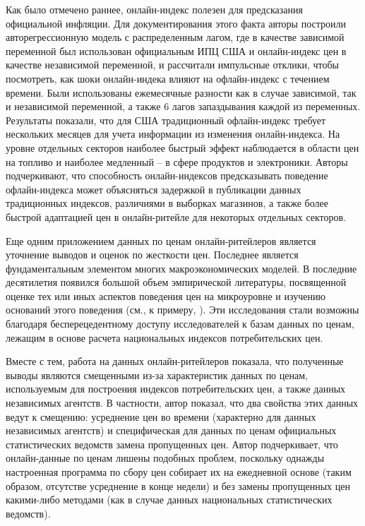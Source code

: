 Как было отмечено раннее, онлайн-индекс полезен для предсказания официальной инфляции. Для документирования этого факта авторы построили авторегрессионную модель с распределенным лагом, где в качестве зависимой переменной был использован официальным ИПЦ США и онлайн-индекс цен в качестве независимой переменной, и рассчитали импульсные отклики, чтобы посмотреть, как шоки онлайн-индека влияют на офлайн-индекс с течением времени. Были использованы ежемесячные разности как в случае зависимой, так и независимой переменной, а также 6 лагов запаздывания каждой из переменных. Результаты показали, что для США традиционный офлайн-индекс требует нескольких месяцев для учета информации из изменения онлайн-индекса. На уровне отдельных секторов наиболее быстрый эффект наблюдается в области цен на топливо и наиболее медленный – в сфере продуктов и электроники. Авторы подчеркивают, что способность онлайн-индексов предсказывать поведение офлайн-индекса может объясняться задержкой в публикации данных традиционных индексов, различиями в выборках магазинов, а также более быстрой адаптацией цен в онлайн-ритейле для некоторых отдельных секторов. 

Еще одним приложением данных по ценам онлайн-ритейлеров является уточнение выводов и оценок по жесткости цен. Последнее является фундаментальным элементом многих макроэкономических моделей. В последние десятилетия появился большой объем эмпирической литературы, посвященной оценке тех или иных аспектов поведения цен на микроуровне и изучению оснований этого поведения (см., к примеру, \cite{bils2004some,klenow2008state,gagnon2009}). Эти исследования стали возможны благодаря бесперецедентному доступу исследователей к базам данных по ценам, лежащим в основе расчета национальных индексов потребительских цен.

Вместе с тем, работа \cite{cavallo2018scraped} на данных онлайн-ритейлеров показала, что полученные выводы являются смещенными из-за характеристик данных по ценам, используемым для построения индексов потребительских цен, а также данных независимых агентств. В частности, автор показал, что два свойства этих данных ведут к смещению: усреднение цен во времени (характерно для данных независимых агентств) и специфическая для данных по ценам официальных статистических ведомств замена пропущенных цен. Автор подчеркивает, что онлайн-данные по ценам лишены подобных проблем, поскольку однажды настроенная программа по сбору цен собирает их на ежедневной основе (таким образом, отсутстве усреднение в конце недели) и без замены пропущенных цен какими-либо методами (как в случае данных национальных статистических ведомств).

